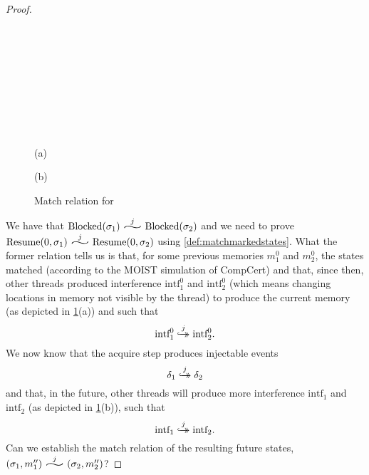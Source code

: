 \begin{proof}
\begin{enumerate}
\end{enumerate}
 
 \begin{figure}
\center
\begin{multicols}{2}

\

\



\

\

\

(a)
\columnbreak


(b)
\end{multicols}
\caption{Match relation for }\label{fig:Blockedmactch}
\end{figure}
 
\noindent We have that $\mathrm{Blocked}(\sigma_1)  \widesim{j}  \mathrm{Blocked}(\sigma_2)$ and we need to prove $\mathrm{Resume}(0,\sigma_1)  \widesim{j}  \mathrm{Resume}(0,\sigma_2)$ using \cref{def:matchmarkedstates}. What the former relation tells us is that, for some previous memories $m_1^0$ and $m_2^0$, the states matched (according to the MOIST simulation of CompCert) and that, since then, other threads produced interference $\text{intf}_1^0$ and $\text{intf}_2^0$ (which means changing locations in memory not visible by the thread) to produce the current memory (as depicted in \cref{fig:Blockedmactch}(a)) and such that 
\begin{equation}\label{eqn:inft10} \text{intf}_1^0 \overset{j}{\hookrightarrow\mathrel{\mspace{-15mu}}\rightarrow} \text{intf}_2^0.\end{equation} 
We now know that the acquire step produces injectable events
\begin{equation}\label{eqn:delta1} \delta_1 \overset{j}{\hookrightarrow\mathrel{\mspace{-15mu}}\rightarrow} \delta_2\end{equation}
 and that, in the future, other threads will produce more interference $\text{intf}_1$ and $\text{intf}_2$ (as depicted in \cref{fig:Blockedmactch}(b)), such that 
\begin{equation}\label{eqn:inft1} \text{intf}_1 \overset{j}{\hookrightarrow\mathrel{\mspace{-15mu}}\rightarrow} \text{intf}_2.\end{equation} 
 Can we establish the match relation of the resulting future states, $(\sigma_1, m_1'') \widesim{j} (\sigma_2, m_2'')$?


\end{proof}
